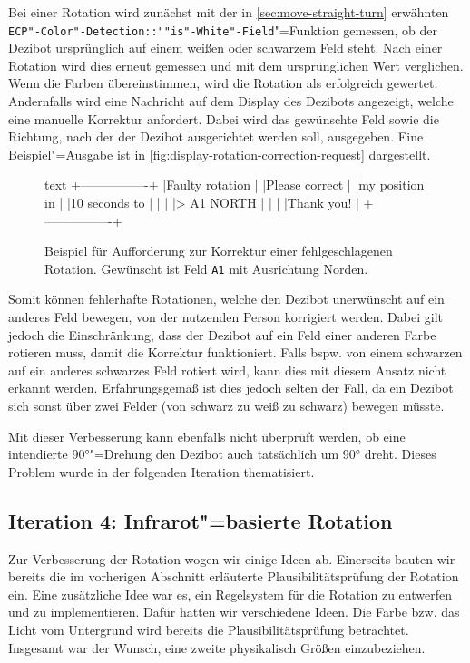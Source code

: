 Bei einer Rotation wird zunächst mit der in \autoref{sec:move-straight-turn} erwähnten \texttt{ECP"-Color"-Detection::""is"-White"-Field}"=Funktion gemessen, ob der Dezibot ursprünglich auf einem weißen oder schwarzem Feld steht. Nach einer Rotation wird dies erneut gemessen und mit dem ursprünglichen Wert verglichen. Wenn die Farben übereinstimmen, wird die Rotation als erfolgreich gewertet. Andernfalls wird eine Nachricht auf dem Display des Dezibots angezeigt, welche eine manuelle Korrektur anfordert. Dabei wird das gewünschte Feld sowie die Richtung, nach der der Dezibot ausgerichtet werden soll, ausgegeben. Eine Beispiel"=Ausgabe ist in \autoref{fig:display-rotation-correction-request} dargestellt.

\begin{figure}[h]
\centering
\begin{cminted}{text}
+----------------+
|Faulty rotation |
|Please correct  |
|my position in  |
|10 seconds to   |
|                |
|> A1 NORTH      |
|                |
|Thank you!      |
+----------------+
\end{cminted}
\caption{Beispiel für Aufforderung zur Korrektur einer fehlgeschlagenen Rotation. Gewünscht ist Feld \texttt{A1} mit Ausrichtung Norden.}
\label{fig:display-rotation-correction-request}
\end{figure}

Somit können fehlerhafte Rotationen, welche den Dezibot unerwünscht auf ein anderes Feld bewegen, von der nutzenden Person korrigiert werden. Dabei gilt jedoch die Einschränkung, dass der Dezibot auf ein Feld einer anderen Farbe rotieren muss, damit die Korrektur funktioniert. Falls bspw. von einem schwarzen auf ein anderes schwarzes Feld rotiert wird, kann dies mit diesem Ansatz nicht erkannt werden. Erfahrungsgemäß ist dies jedoch selten der Fall, da ein Dezibot sich sonst über zwei Felder (von schwarz zu weiß zu schwarz) bewegen müsste.

Mit dieser Verbesserung kann ebenfalls nicht überprüft werden, ob eine intendierte 90°"=Drehung den Dezibot auch tatsächlich um 90° dreht. Dieses Problem wurde in der folgenden Iteration thematisiert.


\subsection{Iteration 4: Infrarot"=basierte Rotation}
\label{sec:movement-ir}

Zur Verbesserung der Rotation wogen wir einige Ideen ab. Einerseits bauten wir bereits die im vorherigen Abschnitt erläuterte Plausibilitätsprüfung der Rotation ein. Eine zusätzliche Idee war es, ein Regelsystem für die Rotation zu entwerfen und zu implementieren. Dafür hatten wir verschiedene Ideen. Die Farbe bzw. das Licht vom Untergrund wird bereits die Plausibilitätsprüfung betrachtet. Insgesamt war der Wunsch, eine zweite physikalisch Größen einzubeziehen.

